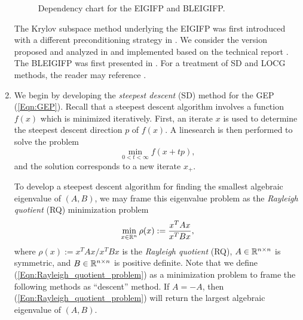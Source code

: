 \begin{enumerate}
\begin{figure}[H] 
\centering
{}
\caption{Dependency chart for the EIGIFP and BLEIGIFP.}
\label{Fig:eigifp_flowchart}
\end{figure}


The Krylov subspace method underlying the EIGIFP was first introduced with a different preconditioning strategy in \cite{knyazev1987convergence}.   We consider the version proposed and analyzed in \cite{golub2002inverse} and implemented based on the technical report \cite{money2005algorithm}.  The BLEIGIFP was first presented in \cite{quillen2010block}.  For a treatment of SD and LOCG methods, the reader may reference \cite{li2015rayleigh}.





\item

We begin by developing the \textit{steepest descent} (SD) method for the GEP (\ref{Eqn:GEP}).  Recall that a steepest descent algorithm involves a function $f(x)$ which is minimized iteratively.  First, an iterate $x$ is used to determine the steepest descent direction $p$ of $f(x)$.  A linesearch is then performed to solve the problem 
\[
\min\limits_{0 < t < \infty} f(x+tp),
\]
and the solution corresponds to a new iterate $x_+$.


To develop a steepest descent algorithm for finding the smallest algebraic eigenvalue of $(A,B)$, we may frame this eigenvalue problem as the \textit{Rayleigh quotient} (RQ) minimization problem
\begin{equation}			\label{Eqn:Rayleigh_quotient_problem}
\min\limits_{x \in {\mathbb R}^n} \rho(x) := \frac{x^TAx}{x^TBx},
\end{equation}
where $\rho(x) := {x^TAx}/{x^TBx}$ is the \textit{Rayleigh quotient} (RQ), $A \in {\mathbb R}^{n \times n}$ is symmetric, and $B \in {\mathbb R}^{n \times n}$ is positive definite.  Note that we define (\ref{Eqn:Rayleigh_quotient_problem}) as a minimization problem to frame the following methods as ``descent'' method.  If $A = -A$, then (\ref{Eqn:Rayleigh_quotient_problem}) will return the largest algebraic eigenvalue of $(A,B)$.


\end{enumerate}
